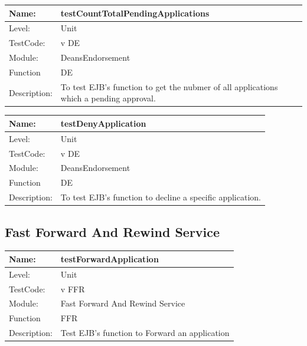 \documentclass[12pt]{article}
\begin{document}
\begin{center}
\begin{tabular}{|l|p{12cm}|}
\hline

 Name: & testCountTotalPendingApplications  \\
\hline
Level: & Unit \\
\hline
TestCode: & v DE \\
\hline
Module:& DeansEndorsement \\
\hline
Function & DE \\
\hline
Description: & To test EJB's function to get the nubmer of all applications which a pending approval. \\
\hline
\end{tabular}
\end{center}

\begin{center}
\begin{tabular}{|l|p{12cm}|}
\hline

 Name: & testDenyApplication  \\
\hline
Level: & Unit \\
\hline
TestCode: & v DE \\
\hline
Module:& DeansEndorsement \\
\hline
Function & DE \\
\hline
Description: & To test EJB's function to decline a specific application. \\
\hline
\end{tabular}
\end{center}

\subsection{Fast Forward And Rewind Service}

\begin{center}
\begin{tabular}{|l|p{12cm}|}
\hline

 Name: & testForwardApplication  \\
\hline
Level: & Unit \\
\hline
TestCode: & v FFR \\
\hline
Module:& Fast Forward And Rewind Service \\
\hline
Function & FFR \\
\hline
Description: & Test EJB's function to Forward an application\\
\hline
\end{tabular}
\end{center}
\end{document}
